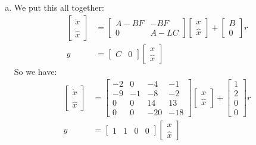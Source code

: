 \documentclass[11pt]{article}
\begin{document}
\begin{enumerate}[a)]
    \item We put this all together:
    \begin{align*}
        \begin{bmatrix}
            \dot{x} \\ \dot{\hat{x}}
        \end{bmatrix} &= \begin{bmatrix}
            A - BF & -BF \\ 0 & A - LC
        \end{bmatrix} \begin{bmatrix}
            x \\ \hat{x}
        \end{bmatrix} + \begin{bmatrix}
            B \\ 0
        \end{bmatrix} r \\
        y &= \begin{bmatrix}
            C & 0
        \end{bmatrix} \begin{bmatrix}
            x \\ \hat{x}
        \end{bmatrix}
    \end{align*}
    So we have:
    \begin{align*}
        \begin{bmatrix}
            \dot{x} \\ \dot{\hat{x}}
        \end{bmatrix} &= \begin{bmatrix}
            -2 & 0 & -4 & -1 \\
            -9 & -1 & -8 & -2 \\
            0 & 0 & 14 & 13 \\
            0 & 0 & -20 & -18
        \end{bmatrix} \begin{bmatrix}
            x \\ \hat{x}
        \end{bmatrix} + \begin{bmatrix}
            1 \\ 2 \\ 0 \\ 0
        \end{bmatrix} r \\
        y &= \begin{bmatrix}
            1 & 1 & 0 & 0
        \end{bmatrix} \begin{bmatrix}
            x \\ \hat{x}
        \end{bmatrix}
    \end{align*}
\end{enumerate}
\end{document}
